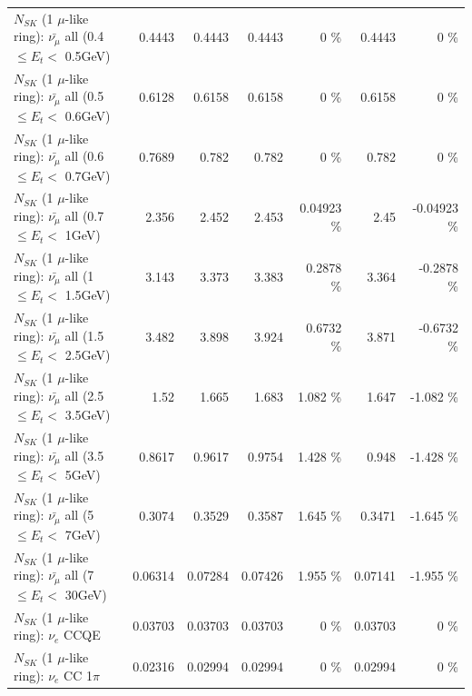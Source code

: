 \begin{table}
\begin{tabular}{| l | r | r | r  r | r  r |}
 $N_{SK}$ (1 $\mu$-like ring): $\bar{\nu_{\mu}}$ all (0.4 $\leq E_{t} <$ 0.5GeV) &          0.4443 &          0.4443 &          0.4443 &        0 \%  &          0.4443 &        0 \%  \\ 
 $N_{SK}$ (1 $\mu$-like ring): $\bar{\nu_{\mu}}$ all (0.5 $\leq E_{t} <$ 0.6GeV) &          0.6128 &          0.6158 &          0.6158 &        0 \%  &          0.6158 &        0 \%  \\ 
 $N_{SK}$ (1 $\mu$-like ring): $\bar{\nu_{\mu}}$ all (0.6 $\leq E_{t} <$ 0.7GeV) &          0.7689 &           0.782 &           0.782 &        0 \%  &           0.782 &        0 \%  \\ 
   $N_{SK}$ (1 $\mu$-like ring): $\bar{\nu_{\mu}}$ all (0.7 $\leq E_{t} <$ 1GeV) &           2.356 &           2.452 &           2.453 &  0.04923 \%  &            2.45 & -0.04923 \%  \\ 
   $N_{SK}$ (1 $\mu$-like ring): $\bar{\nu_{\mu}}$ all (1 $\leq E_{t} <$ 1.5GeV) &           3.143 &           3.373 &           3.383 &   0.2878 \%  &           3.364 &  -0.2878 \%  \\ 
 $N_{SK}$ (1 $\mu$-like ring): $\bar{\nu_{\mu}}$ all (1.5 $\leq E_{t} <$ 2.5GeV) &           3.482 &           3.898 &           3.924 &   0.6732 \%  &           3.871 &  -0.6732 \%  \\ 
 $N_{SK}$ (1 $\mu$-like ring): $\bar{\nu_{\mu}}$ all (2.5 $\leq E_{t} <$ 3.5GeV) &            1.52 &           1.665 &           1.683 &    1.082 \%  &           1.647 &   -1.082 \%  \\ 
   $N_{SK}$ (1 $\mu$-like ring): $\bar{\nu_{\mu}}$ all (3.5 $\leq E_{t} <$ 5GeV) &          0.8617 &          0.9617 &          0.9754 &    1.428 \%  &           0.948 &   -1.428 \%  \\ 
     $N_{SK}$ (1 $\mu$-like ring): $\bar{\nu_{\mu}}$ all (5 $\leq E_{t} <$ 7GeV) &          0.3074 &          0.3529 &          0.3587 &    1.645 \%  &          0.3471 &   -1.645 \%  \\ 
    $N_{SK}$ (1 $\mu$-like ring): $\bar{\nu_{\mu}}$ all (7 $\leq E_{t} <$ 30GeV) &         0.06314 &         0.07284 &         0.07426 &    1.955 \%  &         0.07141 &   -1.955 \%  \\ 
\hline
\hline
\hline
                                      $N_{SK}$ (1 $\mu$-like ring): $\nu_e$ CCQE &         0.03703 &         0.03703 &         0.03703 &        0 \%  &         0.03703 &        0 \%  \\ 
                                 $N_{SK}$ (1 $\mu$-like ring): $\nu_e$ CC 1$\pi$ &         0.02316 &         0.02994 &         0.02994 &        0 \%  &         0.02994 &        0 \%  \\ 

\end{tabular}
\end{table}
